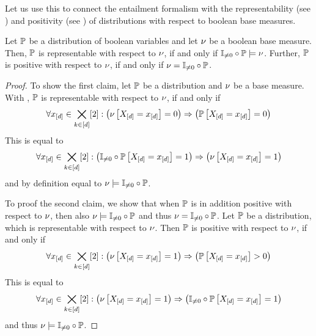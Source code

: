 Let us use this to connect the entailment formalism with the representability (see ) and positivity (see ) of distributions with respect to boolean base measures.

\begin{theorem}\label{the:minimalRepPosBaseMeasure}
	Let $\mathbb{P}$ be a distribution of boolean variables and let $\nu$ be a boolean base measure.
	Then, $\mathbb{P}$ is representable with respect to $\nu$, if and only if $\mathbb{I}_{\neq0}\circ\mathbb{P}\models\nu$.
	Further, $\mathbb{P}$ is positive with respect to $\nu$, if and only if $\nu=\mathbb{I}_{\neq0}\circ\mathbb{P}$.
\end{theorem}
\begin{proof}
	To show the first claim, let $\mathbb{P}$ be a distribution and $\nu$ be a base measure.
	With , $\mathbb{P}$ is representable with respect to $\nu$, if and only if
	\begin{align*}
		\forall{x_{[d]}\in\bigtimes_{k\in[d]}[2]}:{\left(\nu\left[X_{[d]}=x_{[d]}\right]=0\right)\Rightarrow\left(\mathbb{P}\left[X_{[d]}=x_{[d]}\right]=0\right)}
	\end{align*}
	This is equal to
	\begin{align*}
		\forall{x_{[d]}\in\bigtimes_{k\in[d]}[2]}:{\left(\mathbb{I}_{\neq0}\circ\mathbb{P}\left[X_{[d]}=x_{[d]}\right]=1\right)\Rightarrow\left(\nu\left[X_{[d]}=x_{[d]}\right]=1\right)}
	\end{align*}
	and by definition  equal to $\nu\models\mathbb{I}_{\neq0}\circ\mathbb{P}$.
	
	To proof the second claim, we show that when $\mathbb{P}$ is in addition positive with respect to $\nu$, then also $\nu\models\mathbb{I}_{\neq0}\circ\mathbb{P}$ and thus $\nu=\mathbb{I}_{\neq0}\circ\mathbb{P}$.
	Let $\mathbb{P}$ be a distribution, which is representable with respect to $\nu$.
	Then $\mathbb{P}$ is positive with respect to $\nu$, if and only if
	\begin{align*}
		\forall{x_{[d]}\in\bigtimes_{k\in[d]}[2]}:{\left(\nu\left[X_{[d]}=x_{[d]}\right]=1\right)\Rightarrow\left(\mathbb{P}\left[X_{[d]}=x_{[d]}\right]>0\right)}
	\end{align*}
	This is equal to
	\begin{align*}
		\forall{x_{[d]}\in\bigtimes_{k\in[d]}[2]}:{\left(\nu\left[X_{[d]}=x_{[d]}\right]=1\right)\Rightarrow\left(\mathbb{I}_{\neq0}\circ\mathbb{P}\left[X_{[d]}=x_{[d]}\right]=1\right)}
	\end{align*}
	and thus $\nu\models\mathbb{I}_{\neq0}\circ\mathbb{P}$.
\end{proof}



